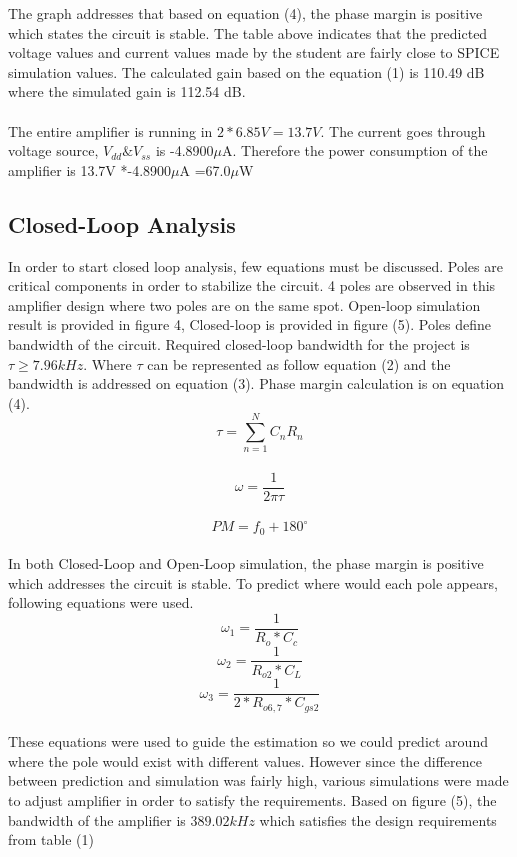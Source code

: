 \documentclass[conference,compsoc]{IEEEtran}
\begin{document}
The graph addresses that based on equation (4), the phase margin is positive which states the circuit is stable. The table above indicates that the predicted voltage values and current values made by the student are fairly close to SPICE simulation values. The calculated gain based on the equation (1) is 110.49 dB where the simulated gain is 112.54 dB.\\
\\The entire amplifier is running in \(2 * 6.85V = 13.7V\). The current goes through voltage source, \(V_{dd}\&V_{ss}\) is -4.8900\(\mu\)A. Therefore the power consumption of the amplifier is 13.7V *-4.8900\(\mu\)A =67.0\(\mu\)W

\subsection{Closed-Loop Analysis}
In order to start closed loop analysis, few equations must be discussed. Poles are critical components in order to stabilize the circuit. 4 poles are observed in this amplifier design where two poles are on the same spot. Open-loop simulation result is provided in figure 4, Closed-loop is provided in figure  (5). Poles define bandwidth of the circuit. Required closed-loop bandwidth for the project is \(\tau \geq 7.96kHz\). Where \(\tau\) can be represented as follow equation (2) and the bandwidth is addressed on equation (3). Phase margin calculation is on equation (4).
\begin{equation}
\tau = \sum_{n=1}^{N} C_nR_n
\end{equation}\\
\begin{equation}
\omega = \frac{1}{2\pi\tau}
\end{equation}\\
\begin{equation}
PM = f_{0} + 180^{\circ}
\end{equation}\\

In both Closed-Loop and Open-Loop simulation, the phase margin is positive which addresses the circuit is stable. To predict where would each pole appears, following equations were used.
\begin{equation}
\omega_1 = \frac{1}{R_o*C_c}
\end{equation}
\begin{equation}
\omega_2 = \frac{1}{R_{o2}*C_L}
\end{equation}
\begin{equation}
\omega_3 = \frac{1}{2*R_{o6,7}*C_{gs2}}
\end{equation}\\
These equations were used to guide the estimation so we could predict around where the pole would exist with different values. However since the difference between prediction and simulation was fairly high, various simulations were made to adjust amplifier in order to satisfy the requirements. Based on figure (5), the bandwidth of the amplifier is \(389.02kHz\) which satisfies the design requirements from table (1)\\
\end{document}
